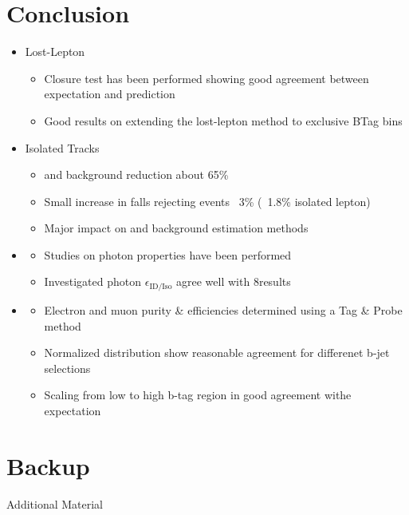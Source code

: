 \documentclass{beamer}
\begin{document}
\section{Conclusion}
\begin{frame}

\begin{itemize}
 \item Lost-Lepton
 \begin{itemize}
  \item Closure test has been performed showing good agreement between expectation and prediction
  \item Good results on extending the lost-lepton method to exclusive BTag bins 
 \end{itemize}
 \item Isolated Tracks
 \begin{itemize}
  \item \ttbar and \wpj background reduction about 65\%
  \item Small increase in falls rejecting events ~3\% (~1.8\% isolated lepton)
  \item Major impact on \ttbar and \wpj background estimation methods
 \end{itemize}
  \item \photonJets
 \begin{itemize}
  \item Studies on photon properties have been performed
  \item Investigated photon $\epsilon_{\text{ID/Iso}}$ agree well with 8\tev results
 \end{itemize}
 \item \Zll
 \begin{itemize}
  \item Electron and muon purity \& efficiencies determined using a Tag \& Probe method
  \item Normalized \met distribution show reasonable agreement for differenet b-jet selections
  \item Scaling from low to high b-tag region in good agreement withe expectation
 \end{itemize}

 
\end{itemize}


\end{frame}
\section{Backup}
\begin{frame}
  \begin{center}
    {\Large Additional Material}
  \end{center}
\end{frame}
\end{document}
